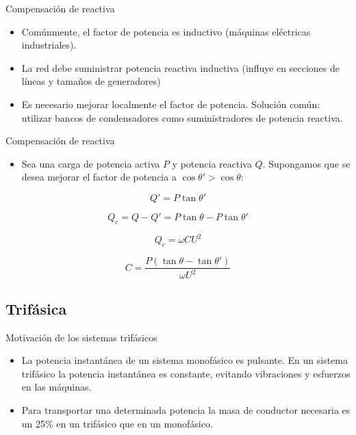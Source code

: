 \documentclass[xcolor={usenames,svgnames,dvipsnames}]{beamer}
\begin{document}
\begin{frame}[label={sec:org30e5824}]{Compensación de reactiva}
\begin{itemize}
\item Comúnmente, el factor de potencia es \alert{inductivo} (máquinas eléctricas
industriales).

\item La red debe suministrar potencia reactiva inductiva (influye en secciones de líneas y tamaños de generadores)

\item Es necesario mejorar \alert{localmente} el factor de potencia. Solución
común: utilizar \alert{bancos de condensadores} como suministradores de
potencia reactiva.
\end{itemize}
\end{frame}

\begin{frame}[label={sec:org86b3523}]{Compensación de reactiva}
\begin{itemize}
\item Sea una carga de potencia activa \(P\) y potencia reactiva \(Q\). Supongamos que se desea mejorar el factor de potencia a \(\cos \theta' > \cos \theta\):
\end{itemize}

\[
  Q' = P \tan \theta'
\]

\[
  Q_c = Q - Q' = P \tan \theta - P \tan \theta'
\]

\[
  Q_c = \omega C U^2
\]

\[
C = \frac{P (\tan \theta - \tan \theta')}{\omega U^2}
\]
\end{frame}


\subsection{Trifásica}
\label{sec:org4692e3c}

\begin{frame}[label={sec:org49e3fab}]{Motivación de los sistemas trifásicos}
\begin{itemize}
\item La potencia instantánea de un sistema monofásico es pulsante. En un
sistema trifásico la potencia instantánea es constante, evitando
vibraciones y esfuerzos en las máquinas.

\item Para transportar una determinada potencia la masa de conductor
necesaria es un 25\% en un trifásico que en un monofásico.
\end{itemize}
\end{frame}
\end{document}
